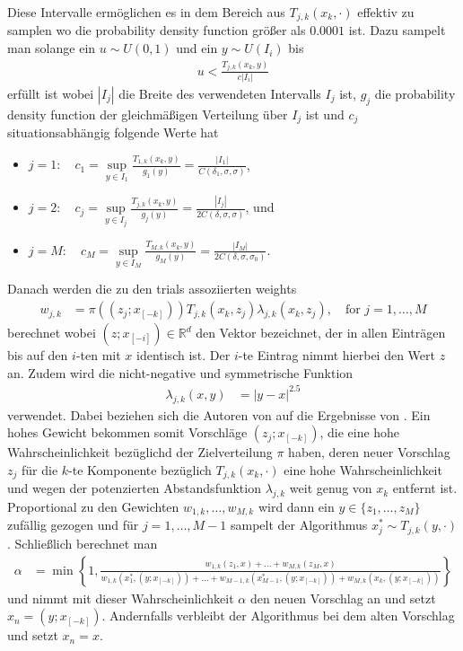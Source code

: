 \documentclass{scrartcl}
\begin{document}
    Diese Intervalle ermöglichen es in dem Bereich aus $T_{j,k}(x_k,\cdot)$ effektiv zu samplen wo die probability density function größer als $0.0001$ ist.
    Dazu sampelt man solange ein $u\sim U(0,1)$ und ein $y\sim U(I_i)$ bis
    \begin{align*}
        u < \frac{T_{j,k}(x_k,y)}{c|I_i|}
    \end{align*}
    erfüllt ist wobei $|I_j|$ die Breite des verwendeten Intervalls $I_j$ ist, $g_j$ die probability density function der gleichmäßigen Verteilung über $I_j$ ist und $c_j$ situationsabhängig folgende Werte hat
    \begin{itemize}
        \item $j=1:\quad c_1=\sup\limits_{y\in I_1}\frac{T_{1,k}(x_k,y)}{g_1(y)}=\frac{|I_1|}{C(\delta_1,\sigma,\sigma)}$,
        \item $j=2:\quad c_j=\sup\limits_{y\in I_j}\frac{T_{j,k}(x_k,y)}{g_j(y)}=\frac{|I_j|}{2C(\delta,\sigma,\sigma)}$, und
        \item $j=M:\quad c_M=\sup\limits_{y\in I_M}\frac{T_{M,k}(x_k,y)}{g_M(y)}=\frac{|I_M|}{2C(\delta,\sigma,\sigma_0)}$.
    \end{itemize}
    Danach werden die zu den trials assoziierten weights
    \begin{align*}
        w_{j,k}&=\pi((z_j;x_{[-k]}))T_{j,k}(x_k,z_j)\lambda_{j,k}(x_k,z_j),\quad\text{for }j=1,\dots,M
    \end{align*}
    berechnet wobei $(z;x_{[-i]})\in\mathbb{R}^d$ den Vektor bezeichnet, der in allen Einträgen bis auf den $i$-ten mit $x$ identisch ist. Der $i$-te Eintrag nimmt hierbei den Wert $z$ an.
    Zudem wird die nicht-negative und symmetrische Funktion
    \begin{align*}
        \lambda_{j,k}(x,y)&=|y-x|^{2.5}%
    \end{align*}
    verwendet. Dabei beziehen sich die Autoren von \cite{lau2019} auf die Ergebnisse von \cite{yang2019}. Ein hohes Gewicht bekommen somit Vorschläge $(z_j;x_{[-k]})$, die eine hohe Wahrscheinlichkeit bezüglichd der
    Zielverteilung $\pi$ haben, deren neuer Vorschlag $z_j$ für die $k$-te Komponente bezüglich $T_{j,k}(x_k,\cdot)$ eine hohe Wahrscheinlichkeit
    und wegen der potenzierten Abstandsfunktion $\lambda_{j,k}$ weit genug von $x_k$ entfernt ist.
    Proportional zu den Gewichten $w_{1,k},\dots,w_{M,k}$ wird dann ein $y\in\{z_1,\dots,z_M\}$ zufällig gezogen und für $j=1,\dots,M-1$ sampelt der Algorithmus
    $x_j^*\sim T_{j,k}(y,\cdot)$. Schließlich berechnet man
    \begin{align*}
        \alpha&=\min\left\{ 1,\frac{w_{1,k}(z_1,x)+\dots+w_{M,k}(z_M,x)}{w_{1,k}(x_1^*,(y;x_{[-k]}))+\dots+w_{M-1,k}(x_{M-1}^*,(y;x_{[-k]}))+w_{M,k}(x_k,(y;x_{[-k]}))} \right\}
    \end{align*}
    und nimmt mit dieser Wahrscheinlichkeit $\alpha$ den neuen Vorschlag an und setzt $x_n=(y;x_{[-k]})$. Andernfalls verbleibt der Algorithmus
    bei dem alten Vorschlag und setzt $x_n=x$.
\end{document}
